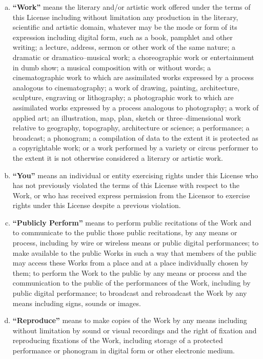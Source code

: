 \documentclass[12pt,letterpaper,oneside,final]{memoir}
\begin{document}
\begin{appendices}
\begin{enumerate}[1.]
\begin{enumerate}[a.]
   \item \textbf{``Work''} means the literary and/or artistic work offered under the terms of this License including without limitation any production in the literary, scientific and artistic domain, whatever may be the mode or form of its expression including digital form, such as a book, pamphlet and other writing; a lecture, address, sermon or other work of the same nature; a dramatic or dramatico--musical work; a choreographic work or entertainment in dumb show; a musical composition with or without words; a cinematographic work to which are assimilated works expressed by a process analogous to cinematography; a work of drawing, painting, architecture, sculpture, engraving or lithography; a photographic work to which are assimilated works expressed by a process analogous to photography; a work of applied art; an illustration, map, plan, sketch or three--dimensional work relative to geography, topography, architecture or science; a performance; a broadcast; a phonogram; a compilation of data to the extent it is protected as a copyrightable work; or a work performed by a variety or circus performer to the extent it is not otherwise considered a literary or artistic work.
   \item \textbf{``You''} means an individual or entity exercising rights under this License who has not previously violated the terms of this License with respect to the Work, or who has received express permission from the Licensor to exercise rights under this License despite a previous violation.
   \item \textbf{``Publicly Perform''} means to perform public recitations of the Work and to communicate to the public those public recitations, by any means or process, including by wire or wireless means or public digital performances; to make available to the public Works in such a way that members of the public may access these Works from a place and at a place individually chosen by them; to perform the Work to the public by any means or process and the communication to the public of the performances of the Work, including by public digital performance; to broadcast and rebroadcast the Work by any means including signs, sounds or images.
  \item \textbf{``Reproduce''} means to make copies of the Work by any means including without limitation by sound or visual recordings and the right of fixation and reproducing fixations of the Work, including storage of a protected performance or phonogram in digital form or other electronic medium.

\end{enumerate}
\end{enumerate}
\end{appendices}
\end{document}
